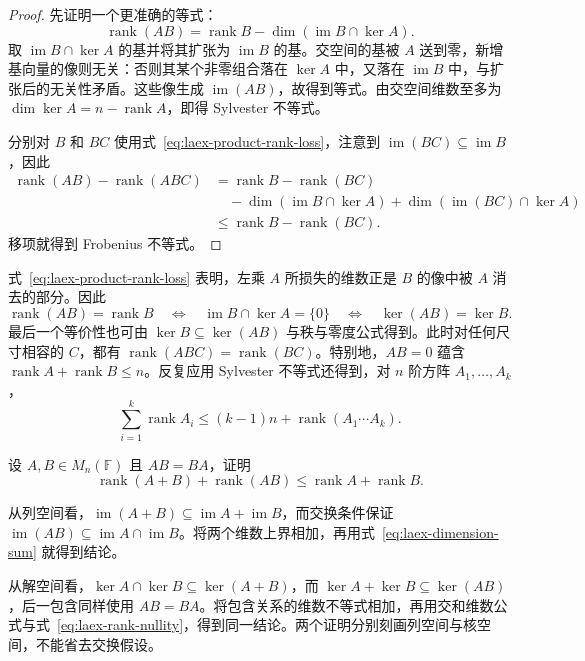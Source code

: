 \begin{proof}
先证明一个更准确的等式：
\begin{equation}
\label{eq:laex-product-rank-loss}
\operatorname{rank}(AB)
=\operatorname{rank}B-\dim(\operatorname{im}B\cap\ker A).
\end{equation}
取 $\operatorname{im}B\cap\ker A$ 的基并将其扩张为 $\operatorname{im}B$ 的基。交空间的基被 $A$ 送到零，新增基向量的像则无关：否则其某个非零组合落在 $\ker A$ 中，又落在 $\operatorname{im}B$ 中，与扩张后的无关性矛盾。这些像生成 $\operatorname{im}(AB)$，故得到等式。由交空间维数至多为 $\dim\ker A=n-\operatorname{rank}A$，即得 Sylvester 不等式。

分别对 $B$ 和 $BC$ 使用式~\eqref{eq:laex-product-rank-loss}，注意到 $\operatorname{im}(BC)\subseteq\operatorname{im}B$，因此
\[
\begin{aligned}
\operatorname{rank}(AB)-\operatorname{rank}(ABC)
&=\operatorname{rank}B-\operatorname{rank}(BC)\\
&\quad-\dim(\operatorname{im}B\cap\ker A)
+\dim(\operatorname{im}(BC)\cap\ker A)\\
&\le\operatorname{rank}B-\operatorname{rank}(BC).
\end{aligned}
\]
移项就得到 Frobenius 不等式。
\end{proof}

式~\eqref{eq:laex-product-rank-loss} 表明，左乘 $A$ 所损失的维数正是 $B$ 的像中被 $A$ 消去的部分。因此
\begin{equation}
\label{eq:laex-product-rank-equality}
\operatorname{rank}(AB)=\operatorname{rank}B
\quad\Longleftrightarrow\quad
\operatorname{im}B\cap\ker A=\{0\}
\quad\Longleftrightarrow\quad
\ker(AB)=\ker B.
\end{equation}
最后一个等价性也可由 $\ker B\subseteq\ker(AB)$ 与秩与零度公式得到。此时对任何尺寸相容的 $C$，都有 $\operatorname{rank}(ABC)=\operatorname{rank}(BC)$。特别地，$AB=0$ 蕴含 $\operatorname{rank}A+\operatorname{rank}B\le n$。反复应用 Sylvester 不等式还得到，对 $n$ 阶方阵 $A_1,\ldots,A_k$，
\[
\sum_{i=1}^k\operatorname{rank}A_i
\le(k-1)n+\operatorname{rank}(A_1\cdots A_k).
\]

\begin{example}
\label{ex:laex-commuting-rank}
设 $A,B\in M_n(\mathbb F)$ 且 $AB=BA$，证明
\[
\operatorname{rank}(A+B)+\operatorname{rank}(AB)
\le\operatorname{rank}A+\operatorname{rank}B.
\]
\end{example}

\begin{solve}
从列空间看，$\operatorname{im}(A+B)\subseteq\operatorname{im}A+\operatorname{im}B$，而交换条件保证 $\operatorname{im}(AB)\subseteq\operatorname{im}A\cap\operatorname{im}B$。将两个维数上界相加，再用式~\eqref{eq:laex-dimension-sum} 就得到结论。

从解空间看，$\ker A\cap\ker B\subseteq\ker(A+B)$，而 $\ker A+\ker B\subseteq\ker(AB)$，后一包含同样使用 $AB=BA$。将包含关系的维数不等式相加，再用交和维数公式与式~\eqref{eq:laex-rank-nullity}，得到同一结论。两个证明分别刻画列空间与核空间，不能省去交换假设。
\end{solve}

